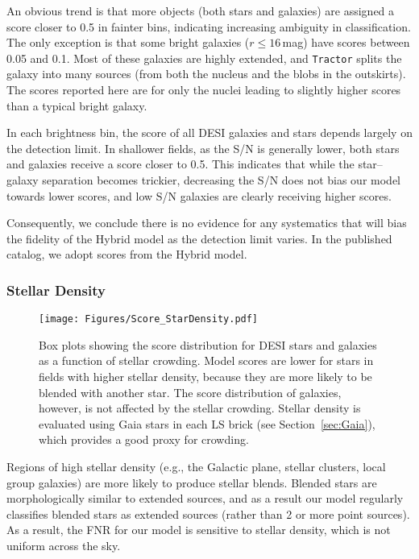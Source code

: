 \documentclass[twocolumn]{aastex631}
\begin{document}
\begin{CJK*}{UTF8}{gbsn}
An obvious trend is that more objects (both stars and galaxies) are assigned a score closer to 0.5 in fainter bins, indicating increasing ambiguity in classification. The only exception is that some bright galaxies ($r\le16$\,mag) have scores between 0.05 and 0.1. Most of these galaxies are highly extended, and \texttt{Tractor} splits the galaxy into many sources (from both the nucleus and the blobs in the outskirts). The scores reported here are for only the nuclei leading to slightly higher scores than a typical bright galaxy.

In each brightness bin, the score of all DESI galaxies and stars depends largely on the detection limit. In shallower fields, as the S/N is generally lower, both stars and galaxies receive a score closer to 0.5. This indicates that while the star--galaxy separation becomes trickier, decreasing the S/N does not bias our model towards lower scores, and low S/N galaxies are clearly receiving higher scores. 

Consequently, we conclude there is no evidence for any systematics that will bias the fidelity of the Hybrid model as the detection limit varies. In the published catalog, we adopt scores from the Hybrid model.

\subsubsection{Stellar Density}\label{sec:density}
\begin{figure*}
    \centering
    \texttt{[image: Figures/Score\_StarDensity.pdf]}
    \caption{Box plots showing the score distribution for DESI stars and galaxies as a function of stellar crowding. Model scores are lower for stars in fields with higher stellar density, because they are more likely to be blended with another star. The score distribution of galaxies, however, is not affected by the stellar crowding. Stellar density is evaluated using Gaia stars in each LS brick (see Section~\ref{sec:Gaia}), which provides a good proxy for crowding.}
    \label{fig:density}
\end{figure*}
Regions of high stellar density (e.g., the Galactic plane, stellar clusters, local group galaxies) are more likely to produce stellar blends. Blended stars are morphologically similar to extended sources, and as a result our model regularly classifies blended stars as extended sources (rather than 2 or more point sources). As a result, the FNR for our model is sensitive to stellar density, which is not uniform across the sky.


\end{CJK*}
\end{document}
